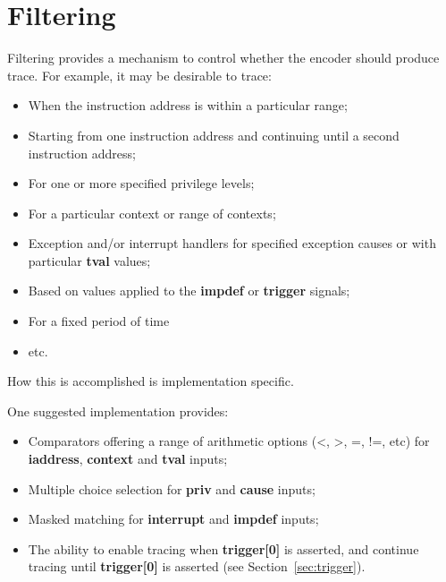 \chapter{Filtering} \label{ch:filtering}

Filtering provides a mechanism to control whether the encoder should produce trace.  For example,
it may be desirable to trace:

\begin{itemize}
  \item When the instruction address is within a particular range;
  \item Starting from one instruction address and continuing until a second instruction address;
  \item For one or more specified privilege levels;
  \item For a particular context or range of contexts;
  \item Exception and/or interrupt handlers for specified exception causes or with particular \textbf{tval} values;
  \item Based on values applied to the \textbf{impdef} or \textbf{trigger} signals;
  \item For a fixed period of time
  \item etc.
\end{itemize}

How this is accomplished is implementation specific.  

One suggested implementation provides: 

\begin{itemize}
  \item Comparators offering a range of arithmetic options (<, >, =, !=, etc) for \textbf{iaddress}, 
    \textbf{context} and \textbf{tval} inputs;
  \item Multiple choice selection for \textbf{priv} and \textbf{cause} inputs;
  \item Masked matching for \textbf{interrupt} and \textbf{impdef} inputs;
  \item The ability to enable tracing when \textbf{trigger[0]} is asserted, and continue tracing 
    until \textbf{trigger[0]} is asserted (see Section~\ref{sec:trigger}).
\end{itemize}


